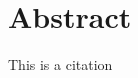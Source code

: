 \cleardoublepage
{}
\section*{Abstract}
This is a citation ~\cite{turing1937computable}
\thispagestyle{empty}



\bigskip
